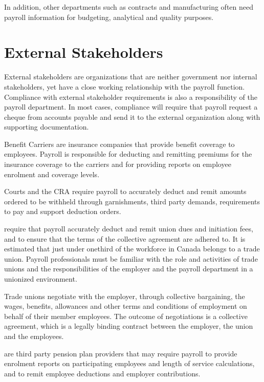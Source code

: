 \documentclass[letterpaper,10pt,english]{sphinxmanual}
\begin{document}
\sphinxAtStartPar
In addition, other departments such as contracts and manufacturing often need payroll
information for budgeting, analytical and quality purposes.


\section{External Stakeholders}
\label{\detokenize{1_introduction:external-stakeholders}}
\sphinxAtStartPar
External stakeholders are organizations that are neither government nor internal stakeholders,
yet have a close working relationship with the payroll function. Compliance with external
stakeholder requirements is also a responsibility of the payroll department. In most cases,
compliance will require that payroll request a cheque from accounts payable and send it to
the external organization along with supporting documentation.

\sphinxAtStartPar
Benefit Carriers are insurance companies that provide benefit coverage to employees.
Payroll is responsible for deducting and remitting premiums for the insurance coverage to the
carriers and for providing reports on employee enrolment and coverage levels.

\sphinxAtStartPar
Courts and the CRA require payroll to accurately deduct and remit amounts ordered to be
withheld through garnishments, third party demands, requirements to pay and support
deduction orders.

\sphinxAtStartPar
{} require that payroll accurately deduct and remit union dues and initiation fees, and to
ensure that the terms of the collective agreement are adhered to. It is estimated that just under
one\sphinxhyphen{}third of the workforce in Canada belongs to a trade union. Payroll professionals must be
familiar with the role and activities of trade unions and the responsibilities of the employer
and the payroll department in a unionized environment.

\sphinxAtStartPar
Trade unions negotiate with the employer, through collective bargaining, the wages, benefits,
allowances and other terms and conditions of employment on behalf of their member
employees. The outcome of negotiations is a collective agreement, which is a legally binding
contract between the employer, the union and the employees.

\sphinxAtStartPar
{} are third party pension plan providers that may require payroll to provide
enrolment reports on participating employees and length of service calculations, and to remit
employee deductions and employer contributions.
\end{document}
